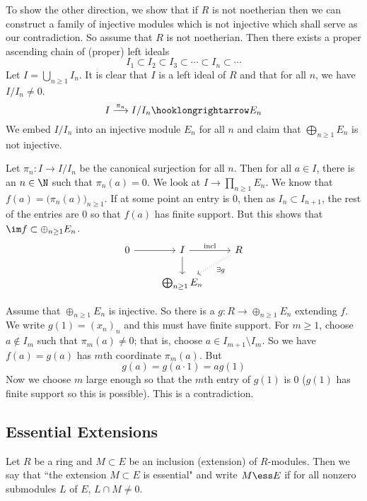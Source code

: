 To show the other direction, we show that if $R$ is not noetherian then we can construct a family of injective modules which is not injective which shall serve as our contradiction. So assume that $R$ is not noetherian. Then there exists a proper ascending chain of (proper) left ideals
\[
I_1 \subset I_2 \subset I_3 \subset \cdots \subset I_n \subset \cdots
\]
Let $I=\bigcup_{n \geq 1} I_n$. It is clear that $I$ is a left ideal of $R$ and that for all $n$, we have $I/I_n \neq 0$. 
\[
I \stackrel{\pi_n}{\longrightarrow} I/I_n \hooklongrightarrow E_n
\]
We embed $I/I_n$ into an injective module $E_n$ for all $n$ and claim that $\bigoplus_{n \geq 1}E_n$ is not injective. 

Let $\pi_n: I \rightarrow I/I_n$ be the canonical surjection for all $n$. Then for all $a \in I$, there is an $n \in \N$ such that $\pi_n(a)=0$. We look at $I \rightarrow \prod_{n \geq 1} E_n$. We know that $f(a)=\big(\pi_n(a)\big)_{n \geq 1}$. If at some point an entry is 0, then as $I_n \subset I_{n+1}$, the rest of the entries are 0 so that $f(a)$ has finite support. But this shows that $\im f \subset \oplus_{n \geq 1} E_n$. 
\[
\begin{tikzcd}
0 \arrow{r} & I \arrow{r}{\text{incl}} \arrow{d} & R \arrow[dotted]{dl}{\exists g} \\  
 &  \bigoplus_{n \geq 1} E_n & 
\end{tikzcd}
\]

Assume that $\oplus_{n \geq 1} E_n$ is injective. So there is a $g: R \rightarrow \oplus_{n \geq 1}E_n$ extending $f$. We write $g(1)=(x_n)_{n}$ and this must have finite support. For $m \geq 1$, choose $a \notin I_m$ such that $\pi_m(a) \neq 0$; that is, choose $a \in I_{m+1} \setminus I_m$. So we have $f(a)=g(a)$ has $m$th coordinate $\pi_m(a)$. But 
\[
g(a)=g(a\cdot 1)=ag(1)
\]
Now we choose $m$ large enough so that the $m$th entry of $g(1)$ is 0 ($g(1)$ has finite support so this is possible). This is a contradiction. 


\subsection{Essential Extensions} 

\begin{dfn}
Let $R$ be a ring and $M \subset E$ be an inclusion (extension) of $R$-modules. Then we say that ``the extension $M \subset E$ is essential" and write $M \ess E$ if for all nonzero submodules $L$ of $E$, $L \cap M \neq 0$. 
\end{dfn}

